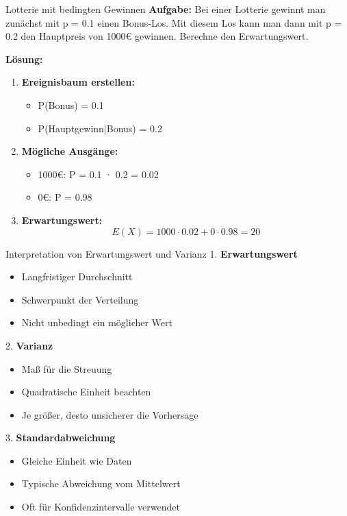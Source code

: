 \begin{example}{Lotterie mit bedingten Gewinnen}
\textbf{Aufgabe:} Bei einer Lotterie gewinnt man zunächst mit p = 0.1 einen Bonus-Los. Mit diesem Los kann man dann mit p = 0.2 den Hauptpreis von 1000€ gewinnen. Berechne den Erwartungswert.

\textbf{Lösung:}
\begin{enumerate}
\item \textbf{Ereignisbaum erstellen:}
   \begin{itemize}
   \item P(Bonus) = 0.1
   \item P(Hauptgewinn|Bonus) = 0.2
   \end{itemize}

\item \textbf{Mögliche Ausgänge:}
   \begin{itemize}
   \item 1000€: P = 0.1 · 0.2 = 0.02
   \item 0€: P = 0.98
   \end{itemize}

\item \textbf{Erwartungswert:}
   $$E(X) = 1000 \cdot 0.02 + 0 \cdot 0.98 = 20$$
\end{enumerate}
\end{example}

\begin{KR}{Interpretation von Erwartungswert und Varianz}
1. \textbf{Erwartungswert}
   \begin{itemize}
   \item Langfristiger Durchschnitt
   \item Schwerpunkt der Verteilung
   \item Nicht unbedingt ein möglicher Wert
   \end{itemize}

2. \textbf{Varianz}
   \begin{itemize}
   \item Maß für die Streuung
   \item Quadratische Einheit beachten
   \item Je größer, desto unsicherer die Vorhersage
   \end{itemize}

3. \textbf{Standardabweichung}
   \begin{itemize}
   \item Gleiche Einheit wie Daten
   \item Typische Abweichung vom Mittelwert
   \item Oft für Konfidenzintervalle verwendet
   \end{itemize}
\end{KR}

